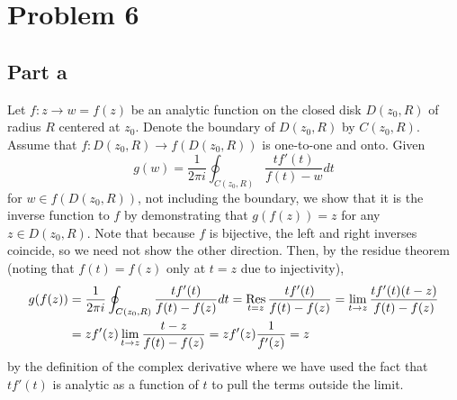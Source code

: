 \documentclass{article}
\begin{document}
\section{Problem 6}
\subsection{Part a}
Let $f:z\rightarrow w=f(z)$ be an analytic function on the closed
    disk $D(z_0, R)$ of radius $R$ centered at $z_0$. Denote the
    boundary of $D(z_0, R)$ by $C(z_0, R)$. Assume that $f: D(z_0,
    R)\to f(D(z_0, R))$ is one-to-one and onto. Given
    $$
    g(w)=\frac{1}{2\pi i}\oint_{C(z_0,R)}\frac{t f'(t)}{f(t)-w}d t
    $$
    for $w\in f(D(z_0, R))$, not including the boundary, we show that it is the inverse function to $f$ by demonstrating that $g(f(z))=z$ for any $z\in D(z_0,R)$. Note that because $f$ is bijective, the left and right inverses coincide, so we need not show the other direction. Then, by the residue theorem (noting that $f(t)=f(z)$ only at $t=z$ due to injectivity),
\begin{align*}
g(f(z))&=\frac{1}{2\pi i}\oint_{C(z_0,R)}\frac{t f'(t)}{f(t)-f(z)}dt=\operatorname*{Res}_{t=z}\frac{t f'(t)}{f(t)-f(z)}=\lim_{t\to z}\frac{t f'(t)(t-z)}{f(t)-f(z)}\\&=
zf'(z)\lim_{t\to z}\frac{t-z}{f(t)-f(z)}=zf'(z)\frac{1}{f'(z)}=z
\end{align*}
by the definition of the complex derivative where we have used the fact that $tf'(t)$ is analytic as a function of $t$ to pull the terms outside the limit.
\end{document}
